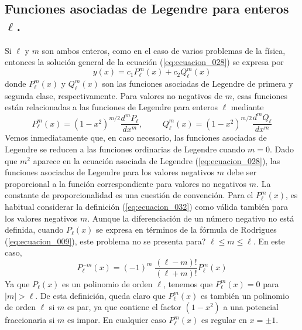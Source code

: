 \subsection*{Funciones asociadas de Legendre para enteros $\ell$.}
Si $\ell$ y $m$ son ambos enteros, como en el caso de varios problemas de la física, entonces la solución general de la ecuación (\ref{eq:ecuacion_028}) se expresa por
\begin{equation}
y(x) = c_{1} P_{\ell}^{m} (x) + c_{2} Q_{\ell}^{m} (x)
\label{eq:ecuacion_031}
\end{equation}
donde $P_{\ell}^{m} (x)$ y $Q_{\ell}^{m} (x)$ son las funciones asociadas de Legendre de primera y segunda clase, respectivamente. Para valores no negativos de $m$, esas funciones están relacionadas a las funciones de Legendre para enteros $\ell$ mediante
\begin{equation}
P_{\ell}^{m} (x) = (1 - x^{2})^{m/2} \dfrac{d^{m} P_{\ell}}{d x^{m}}, \hspace{1cm} Q_{\ell}^{m} (x) = (1 - x^{2})^{m/2} \dfrac{d^{m} Q_{\ell}}{d x^{m}}
\label{eq:ecuacion_032}
\end{equation}
Vemos inmediatamente que, en caso necesario, las funciones asociadas de Legendre se reducen a las funciones ordinarias de Legendre cuando $m = 0$. Dado que $m^{2}$ aparece en la ecuación asociada de Legendre (\ref{eq:ecuacion_028}), las funciones asociadas de Legendre para los valores negativos $m$ debe ser proporcional a la función correspondiente para valores no negativos $m$. La constante de proporcionalidad es una cuestión de convención. Para el $P_{\ell}^{m} (x) $, es habitual considerar la definición (\ref{eq:ecuacion_032}) como válida también para los valores negativos $m$. Aunque la diferenciación de un número negativo no está definida, cuando $P_{\ell}(x)$ se expresa en términos de la fórmula de Rodrigues (\ref{eq:ecuacion_009}), este problema no se presenta para? $\ell \leq m \leq \ell$. En este caso,
\begin{equation}
P_{\ell}^{-m} (x) = (-1)^{m} \; \dfrac{(\ell - m)!}{(\ell + m)!} P_{\ell}^{m} (x)
\label{eq:ecuacion_033}
\end{equation}
Ya que $P_{\ell}(x)$ es un polinomio de orden $\ell$, tenemos que $P_{\ell}^{m}(x)=0$ para $\vert m \vert > \ell$. De esta definición, queda claro que $P_{\ell}^{m} (x)$ es también un polinomio de orden $\ell$ si $m$ es par, ya que contiene el factor $(1-x^{2})$ a una potencial fraccionaria si $m$ es impar. En cualquier caso $P_{\ell}^{m}(x)$ es regular en $x = \pm 1$.
\\
